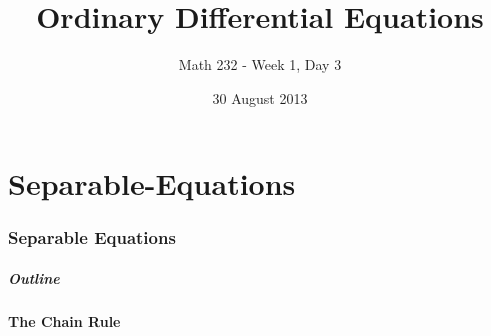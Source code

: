 \part{Separable-Equations}
\section{Separable Equations}


\title{Ordinary Differential Equations}
\subtitle{Math 232 - Week 1, Day 3}
\date{30 August 2013}

\begin{frame}
  \titlepage
\end{frame}

\begin{frame}
  \frametitle{Outline}
  \tableofcontents[ currentsection ]
\end{frame}


\subsection{The Chain Rule}

